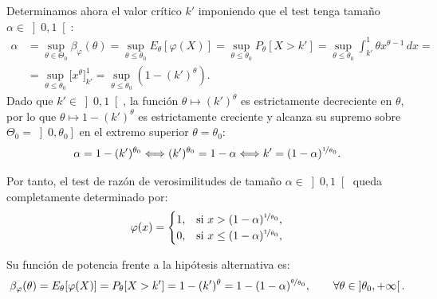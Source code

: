 \begin{ejercicio}
    Determinamos ahora el valor crítico $k'$ imponiendo que el test tenga tamaño $\alpha \in \left]0, 1\right[$:
    \begin{align*}
        \alpha &= \sup_{\theta \in \Theta_0} \beta_\varphi(\theta) = \sup_{\theta \leq \theta_0} E_\theta[\varphi(X)] = \sup_{\theta \leq \theta_0} P_\theta[X > k'] = \sup_{\theta \leq \theta_0} \int_{k'}^{1} \theta x^{\theta - 1} \, dx =\\&= \sup_{\theta \leq \theta_0} \Big[x^\theta\Big]_{k'}^{1} = \sup_{\theta \leq \theta_0} \left(1 - (k')^\theta\right).
    \end{align*}
    Dado que $k' \in \left]0, 1\right[$, la función $\theta \mapsto (k')^\theta$ es estrictamente decreciente en $\theta$, por lo que $\theta \mapsto 1 - (k')^\theta$ es estrictamente creciente y alcanza su supremo sobre $\Theta_0 = \left]0, \theta_0\right]$ en el extremo superior $\theta = \theta_0$:
    \begin{equation*}
        \alpha = 1 - (k')^{\theta_0} \Longleftrightarrow (k')^{\theta_0} = 1 - \alpha \Longleftrightarrow k' = (1 - \alpha)^{\nicefrac{1}{\theta_0}}.
    \end{equation*}
    
    Por tanto, el test de razón de verosimilitudes de tamaño $\alpha \in \left]0, 1\right[$ queda completamente determinado por:
    \begin{equation*}
        \varphi(x) =
        \begin{cases}
            1, & \text{si } x > (1 - \alpha)^{\nicefrac{1}{\theta_0}}, \\
            0, & \text{si } x \leq (1 - \alpha)^{\nicefrac{1}{\theta_0}},
        \end{cases}
    \end{equation*}
    
    Su función de potencia frente a la hipótesis alternativa es:
    \begin{equation*}
        \beta_\varphi(\theta) = E_\theta[\varphi(X)] = P_\theta[X > k'] = 1 - (k')^\theta = 1 - (1 - \alpha)^{\nicefrac{\theta}{\theta_0}}, \qquad \forall \theta \in \left]\theta_0, +\infty\right[.
    \end{equation*}
\end{ejercicio}


